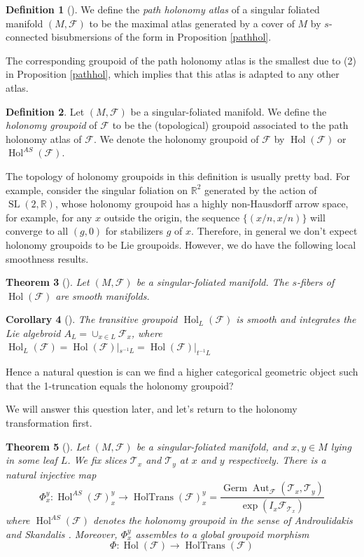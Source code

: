 \documentclass[12pt]{amsart}
\newtheorem{thm}{Theorem}[section]
\newtheorem{cor}[thm]{Corollary}
\theoremstyle{definition}
\newtheorem{defn}[thm]{Definition}
\theoremstyle{remark}
\numberwithin{equation}{section}
\newcommand{\CF}{{\mathcal F}}
\newcommand{\R}{{\mathbb{R}}}
\newcommand{\1}{{\mathbb{1}}}
\newcommand{\SL}{\operatorname{SL}}
\newcommand{\germ}{\operatorname{Germ}}
\newcommand{\aut}{\operatorname{Aut}}
\newcommand{\hol}{\operatorname{Hol}}
\newcommand{\holtrans}{\operatorname{HolTrans}}
\begin{document}
\begin{defn}[\cite{AS06}]
    We define the {\it path holonomy atlas} of a singular foliated manifold $(M, \CF)$ to be the maximal atlas generated by a cover of $M$ by $s$-connected bisubmersions of the form in Proposition \ref{pathhol}.
\end{defn}
The corresponding groupoid of the path holonomy atlas is the smallest due to (2) in Proposition \ref{pathhol}, which implies that this atlas is adapted to any other atlas.

\begin{defn}
    Let $(M, \CF)$ be a singular-foliated manifold. We define the {\it holonomy groupoid} of $\CF$ to be the (topological) groupoid associated to the path holonomy atlas of $\CF$. We denote the holonomy groupoid of $\CF$ by $\hol(\CF)$ or $\hol^{AS}(\CF)$.
\end{defn}
    The topology of holonomy groupoids in this definition is usually pretty bad. For example, \cite[Example 3.7]{AS06} consider the singular foliation on $\R^2$ generated by the action of $\SL(2,\R)$, whose holonomy groupoid has a highly non-Hausdorff arrow space, for example, for any $x$ outside the origin, the sequence $\{(x/n, x/n)\}$ will converge to all $(g,0)$ for stabilizers $g$ of $x$. Therefore, in general we don't expect holonomy groupoids to be Lie groupoids. However, we do have the following local smoothness results.
    \begin{thm}[\cite{Deb13}]
         Let $(M, \CF)$ be a singular-foliated manifold. The $s$-fibers of $\hol(\CF)$ are smooth manifolds.
    \end{thm}
    \begin{cor}[\cite{AZ11}]
    The transitive groupoid $\hol_L(\CF)$  is smooth and integrates the Lie algebroid $A_L = \cup_{x\in L} \CF_x$, where $\hol_L(\CF) = \hol(\CF)|_{s^{-1}L}=\hol(\CF)|_{t^{-1}L}$
    \end{cor}
    
    Hence a natural question is can we find a higher categorical geometric object such that the 1-truncation equals the holonomy groupoid?
    
    We will answer this question later, and let's return to the holonomy transformation first.
\begin{thm}[\cite{AZ12}]
    Let $(M, \CF)$ be a singular-foliated manifold, and $x, y \in M$ lying in some leaf $L$. We fix slices $\mathcal{T}_x$ and $\mathcal{T}_y$ at $x$ and $y$ respectively. There is a natural injective map
    \begin{equation*}
        \Phi^y_x: \hol^{AS}(\CF)^y_x \to \holtrans(\CF)^y_x=\frac{\germ \aut_{\CF}(\mathcal{T}_x, \mathcal{T}_y)}{\exp(I_x \CF_{\mathcal{T}_x})}
    \end{equation*}
    where $\hol^{AS}(\CF)$ denotes the holonomy groupoid in the sense of Androulidakis and Skandalis \cite{AS06}. Moreover, $\Phi^y_x$ assembles to a global groupoid morphism
    $$
    \Phi: \hol(\CF) \to \holtrans(\CF)
    $$
\end{thm}
\end{document}

